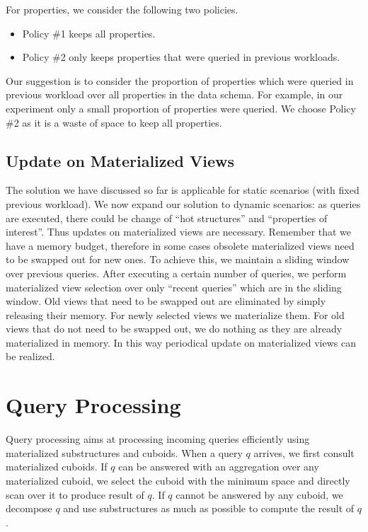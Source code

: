 For properties, we consider the following two policies.

\begin{itemize}
\item Policy \#1 keeps all properties.
\item Policy \#2 only keeps properties that were queried in previous workloads.
\end{itemize}

Our suggestion is to consider the proportion of properties which were queried in previous workload over all properties in the data schema. For example, in our experiment only a small proportion of properties were queried. We choose Policy \#2 as it is a waste of space to keep all properties.


\subsection{Update on Materialized Views}
The solution we have discussed so far is applicable for static scenarios (with fixed previous workload). We now expand our solution to dynamic scenarios: as queries are executed, there could be change of ``hot structures'' and ``properties of interest''. Thus updates on materialized views are necessary. Remember that we have a memory budget, therefore in some cases obsolete materialized views need to be swapped out for new ones. To achieve this, we maintain a sliding window over previous queries. After executing a certain number of queries, we perform materialized view selection over only ``recent queries'' which are in the sliding window. Old views that need to be swapped out are eliminated by simply releasing their memory. For newly selected views we materialize them. For old views that do not need to be swapped out, we do nothing as they are already materialized in memory. In this way periodical update on materialized views can be realized.


\section{Query Processing}
\label{Future Query Processing Part}
Query processing aims at processing incoming queries efficiently using materialized substructures and cuboids. When a query $q$ arrives, we first consult materialized cuboids. If $q$ can be answered with an aggregation over any materialized cuboid, we select the cuboid with the minimum space and directly scan over it to produce result of $q$. If $q$ cannot be answered by any cuboid, we decompose $q$ and use substructures as much as possible to compute the result of $q$.

